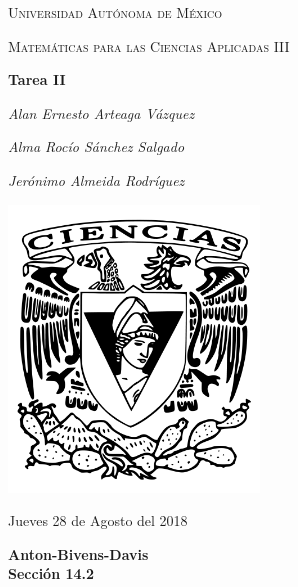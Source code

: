 \documentclass[a4paper,12pt]{article}
\begin{document}
\newcommand{\osf}[2]{\dfrac{#1^2}{#2^2}}
\newcommand{\T}{\Big(2\pi\cdot\sqrt{\dfrac{l}{g}}\Big)}
\newcommand{\alpa}{\dfrac{e^{x \beta -3}{2y\beta +5}}}
\newcommand{\deriv}[2]{\dfrac{\delta #1}{\delta #2}}
\newcommand{\sderiv}[3]{\dfrac{\delta ^2 #1}{\delta #2 \delta #3}}
\newcommand{\ext}{e^{ax-bt}}
\newcommand{\exy}{e^{((x-1)^2 + (y-3)^2}}
\newcommand{\xo}{\vec{x_0}} %
\providecommand{\norm}[1]{\parallel #1\parallel}

\begin{titlepage}
	\centering
	{\scshape\LARGE Universidad Autónoma de México \par}
	\vspace{1cm}
	{\scshape\Large Matemáticas para las Ciencias Aplicadas III\par}
	\vspace{1.5cm}
	{\huge\bfseries Tarea II\par}
	\vspace{.5cm}
	{\Large\itshape Alan Ernesto Arteaga Vázquez \par}
    \vspace{.5cm}
	{\Large\itshape Alma Rocío Sánchez Salgado \par}
    \vspace{.5cm}
	{\Large\itshape Jerónimo Almeida Rodríguez \par}
	\vfill
	 \includegraphics[width=0.5\textwidth]{../escudo_f-ciencias.png}
	\vfill

	{\large Jueves 28 de Agosto del 2018 \par}
\end{titlepage}

\newpage


\textbf{Anton-Bivens-Davis} \\

\textbf{Sección 14.2} \\
\end{document}
